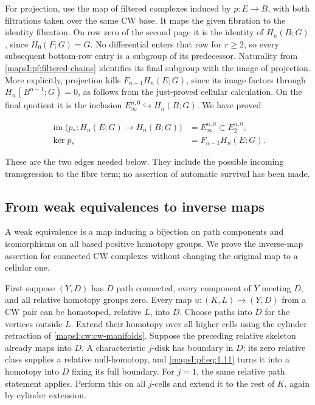 For projection, use the map of filtered complexes induced by \(p:E\to B\), with both filtrations taken over the same CW base. It maps the given fibration to the identity fibration. On row zero of the second page it is the identity of \(H_n(B;G)\), since \(H_0(F;G)=G\). No differential enters that row for \(r\geq2\), so every subsequent bottom-row entry is a subgroup of its predecessor. Naturality from \cref{mapsI:pf:filtered-chains} identifies its final subgroup with the image of projection. More explicitly, projection kills \(F_{n-1}H_n(E;G)\), since its image factors through \(H_n(B^{n-1};G)=0\), as follows from the just-proved cellular calculation. On the final quotient it is the inclusion \(E_\infty^{n,0}\hookrightarrow H_n(B;G)\). We have proved

\begin{equation}
\begin{aligned}
\operatorname{im}\bigl(p_*:H_n(E;G)\to H_n(B;G)\bigr)
&=E_\infty^{n,0}\subset E_2^{n,0},\\
\ker p_*&=F_{n-1}H_n(E;G).
\end{aligned}
\label{mapsI:pf:eq:3.10}
\end{equation}

These are the two edges needed below. They include the possible incoming transgression to the fibre term; no assertion of automatic survival has been made.

\subsection{From weak equivalences to inverse maps}
\label{mapsI:pf:cw-inverses}

A weak equivalence is a map inducing a bijection on path components and isomorphisms on all based positive homotopy groups. We prove the inverse-map assertion for connected CW complexes without changing the original map to a cellular one.

First suppose \((Y,D)\) has \(D\) path connected, every component of \(Y\) meeting \(D\), and all relative homotopy groups zero. Every map \(u:(K,L)\to(Y,D)\) from a CW pair can be homotoped, relative \(L\), into \(D\). Choose paths into \(D\) for the vertices outside \(L\). Extend their homotopy over all higher cells using the cylinder retraction of \cref{mapsI:cw:cw-manifolds}. Suppose the preceding relative skeleton already maps into \(D\). A characteristic \(j\)-disk has boundary in \(D\); its zero relative class supplies a relative null-homotopy, and \eqref{mapsI:pf:eq:1.11} turns it into a homotopy into \(D\) fixing its full boundary. For \(j=1\), the same relative path statement applies. Perform this on all \(j\)-cells and extend it to the rest of \(K\), again by cylinder extension.

